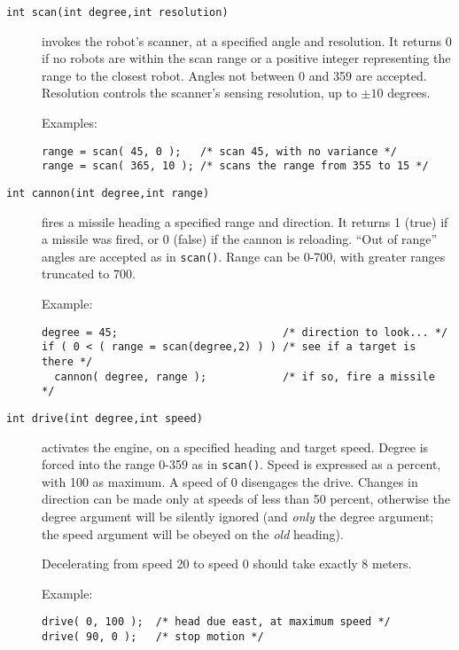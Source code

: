 \documentclass{article}
\begin{document}
\begin{description}
\item[\texttt{int scan(int degree,int resolution)}]
        invokes the robot's scanner, at a specified
        angle and resolution.  It returns 0 if no robots are
        within the scan range or a positive integer representing the
        range to the closest robot.  Angles not between 0 and 359 are accepted.
        Resolution controls the scanner's sensing resolution, up to
        $\pm 10$ degrees.

        Examples:
\begin{verbatim}
range = scan( 45, 0 );   /* scan 45, with no variance */
range = scan( 365, 10 ); /* scans the range from 355 to 15 */
\end{verbatim}

\item[\texttt{int cannon(int degree,int range)}]
        fires a missile heading a specified range
        and direction.  It returns 1 (true) if a missile was fired,
        or 0 (false) if the cannon is reloading.  ``Out of range'' angles
        are accepted as in \texttt{scan()}.  Range can be 0-700, with greater
        ranges truncated to 700.

        Example:
\begin{verbatim}
degree = 45;                          /* direction to look... */
if ( 0 < ( range = scan(degree,2) ) ) /* see if a target is there */
  cannon( degree, range );            /* if so, fire a missile */
\end{verbatim}

\item[\texttt{int drive(int degree,int speed)}]
        activates the engine, on a 
        specified heading and target speed.  Degree is forced into the range
        0-359 as in \texttt{scan()}.  Speed is expressed as a percent,
        with 100 as maximum.  A speed of 0 disengages the drive.  Changes in
        direction can be made only at speeds of less than 50 percent,
        otherwise the degree argument will be silently ignored (and \emph{only}
        the degree argument; the speed argument will be obeyed on the \emph{old}
        heading).

        Decelerating from speed 20 to speed 0 should take exactly 8 meters.

        Example:
\begin{verbatim}
drive( 0, 100 );  /* head due east, at maximum speed */
drive( 90, 0 );   /* stop motion */
\end{verbatim}


\end{description}
\end{document}

